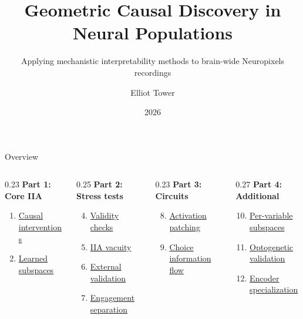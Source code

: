\documentclass[aspectratio=169,11pt]{beamer}
\title{Geometric Causal Discovery in Neural Populations}
\subtitle{Applying mechanistic interpretability methods to brain-wide Neuropixels recordings}
\author{Elliot Tower}
\date{2026}
\institute{}
\begin{document}
\maketitle

\begin{frame}{Overview}

\vspace{0.5em}
{\small
\begin{columns}[T]
\begin{column}{0.23\textwidth}
\textbf{Part 1: Core IIA}
\begin{enumerate}
  \item \hyperlink{sec:1}{Causal interventions}
  \item \hyperlink{sec:2}{Learned subspaces}
\end{enumerate}
\end{column}
\begin{column}{0.25\textwidth}
\textbf{Part 2: Stress tests}
\begin{enumerate}
  \setcounter{enumi}{3}
  \item \hyperlink{sec:4}{Validity checks}
  \item \hyperlink{sec:5}{IIA vacuity}
  \item \hyperlink{sec:6}{External validation}
  \item \hyperlink{sec:7}{Engagement separation}
\end{enumerate}
\end{column}
\begin{column}{0.23\textwidth}
\textbf{Part 3: Circuits}
\begin{enumerate}
  \setcounter{enumi}{7}
  \item \hyperlink{sec:8}{Activation patching}
  \item \hyperlink{sec:9}{Choice information flow}
\end{enumerate}
\end{column}
\begin{column}{0.27\textwidth}
\textbf{Part 4: Additional}
\begin{enumerate}
  \setcounter{enumi}{9}
  \item \hyperlink{sec:10}{Per-variable subspaces}
  \item \hyperlink{sec:11}{Optogenetic validation}
  \item \hyperlink{sec:12}{Encoder specialization}
\end{enumerate}
\end{column}
\end{columns}
}
\end{frame}
\end{document}
